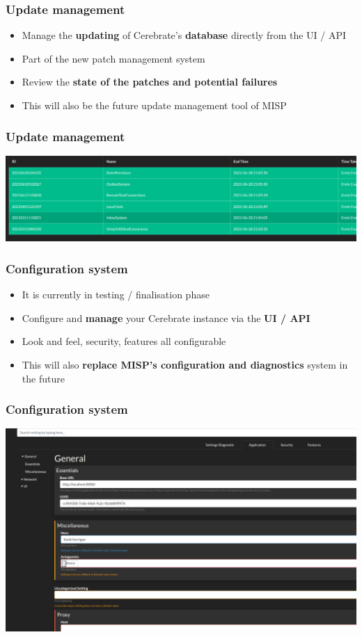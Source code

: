 \begin{frame}
	\frametitle{Update management}
	\begin{itemize}
                \item Manage the {\bf updating} of Cerebrate's {\bf database} directly from the UI / API
                \item Part of the new patch management system
                \item Review the {\bf state of the patches and potential failures}
                \item This will also be the future update management tool of MISP
	\end{itemize}
\end{frame}

\begin{frame}
\frametitle{Update management}
\begin{center}
    \includegraphics[scale=0.3]{updates.png}
\end{center}
\end{frame}

\begin{frame}
	\frametitle{Configuration system}
	\begin{itemize}
                \item It is currently in testing / finalisation phase
                \item Configure and {\bf manage} your Cerebrate instance via the {\bf UI / API}
                \item Look and feel, security, features all configurable
                \item This will also {\bf replace MISP's configuration and diagnostics} system in the future
	\end{itemize}
\end{frame}

\begin{frame}
\frametitle{Configuration system}
\begin{center}
    \includegraphics[scale=0.3]{config.png}
\end{center}
\end{frame}

